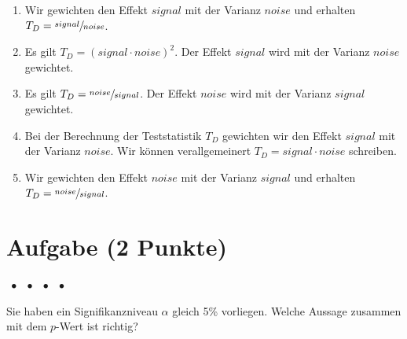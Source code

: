 \documentclass[a4paper, 9pt]{scrartcl}\usepackage[]{graphicx}\usepackage[]{xcolor}
\begin{document}
\begin{enumerate}
\item [\textbf{A} \msquare] Wir gewichten den Effekt $signal$ mit der Varianz $noise$ und erhalten $T_D = \sfrac{signal}{noise}$.
\item [\textbf{B} \msquare] Es gilt $T_D = (signal \cdot noise)^2$. Der Effekt $signal$ wird mit der Varianz $noise$ gewichtet.
\item [\textbf{C} \msquare] Es gilt $T_D = \sfrac{noise}{signal}$. Der Effekt $noise$ wird mit der Varianz $signal$ gewichtet.
\item [\textbf{D} \msquare] Bei der Berechnung der Teststatistik $T_D$ gewichten wir den Effekt $signal$ mit der Varianz $noise$. Wir können verallgemeinert $T_D = signal \cdot noise$ schreiben.
\item [\textbf{E} \msquare] Wir gewichten den Effekt $noise$ mit der Varianz $signal$ und erhalten $T_D = \sfrac{noise}{signal}$.
\end{enumerate}


\section{Aufgabe \hfill (2 Punkte)}

\ifcollection
\begin{flushright}
\tiny\vspace{-2Ex}
\textbf{\examinhaltstart}
\exammodulemathstat $\;\bullet$
\exammodulestat $\;\bullet$
\exammodulestatbbv $\;\bullet$
\exammodulestatversuch $\;\bullet$
\exammodulebiostat
\vspace{-1Ex}
\end{flushright}
\fi




Sie haben ein Signifikanzniveau $\alpha$ gleich 5\% vorliegen. Welche Aussage zusammen mit dem $p$-Wert ist richtig?
\end{document}
